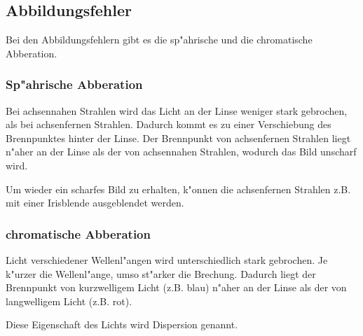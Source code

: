 	\subsection{Abbildungsfehler} %
	\label{sub:abbildungsfehler}

	Bei den Abbildungsfehlern gibt es die sp"ahrische und die chromatische Abberation.
	
	\subsubsection{Sp"ahrische Abberation} %
 	\label{sub:sp_ahrische_abberation}
 
  	Bei achsennahen Strahlen wird das Licht an der Linse weniger stark gebrochen, als bei achsenfernen Strahlen.
  	Dadurch kommt es zu einer Verschiebung des Brennpunktes hinter der Linse.
  	Der Brennpunkt von achsenfernen Strahlen liegt n"aher an der Linse als der von achsennahen Strahlen, wodurch das Bild unscharf wird.

   Um wieder ein scharfes Bild zu erhalten, k"onnen die achsenfernen Strahlen z.B. mit einer Irisblende ausgeblendet werden.

   \subsubsection{chromatische Abberation} %
   \label{sub:chromatische_abberation}
   
   Licht verschiedener Wellenl"angen wird unterschiedlich stark gebrochen.
   Je k"urzer die Wellenl"ange, umso st"arker die Brechung.
   Dadurch liegt der Brennpunkt von kurzwelligem Licht (z.B. blau) n"aher an der Linse als der von langwelligem Licht (z.B. rot).

   Diese Eigenschaft des Lichts wird Dispersion genannt.
